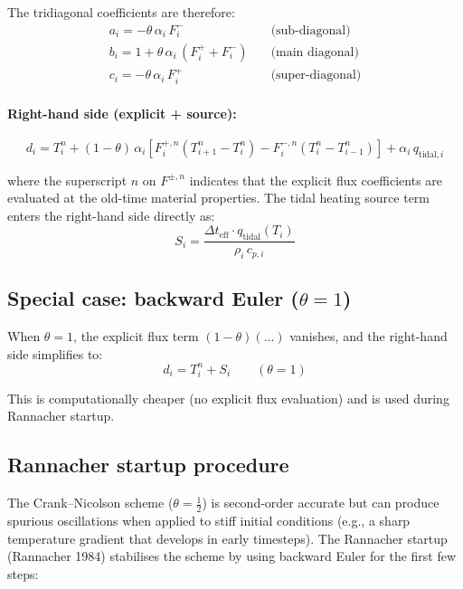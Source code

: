 \documentclass[11pt,a4paper]{article}
\newcommand{\half}{\tfrac{1}{2}}
\begin{document}
The tridiagonal coefficients are therefore:
\begin{align}
\boxed{a_i = -\theta\,\alpha_i\,F_i^{-}}
  &\quad\text{(sub-diagonal)} \label{eq:ai} \\
\boxed{b_i = 1 + \theta\,\alpha_i\,(F_i^{+} + F_i^{-})}
  &\quad\text{(main diagonal)} \label{eq:bi} \\
\boxed{c_i = -\theta\,\alpha_i\,F_i^{+}}
  &\quad\text{(super-diagonal)} \label{eq:ci}
\end{align}

\paragraph{Right-hand side (explicit + source):}
\begin{equation}
d_i = T_i^n
  + (1-\theta)\,\alpha_i\left[
    F_i^{+,n}(T_{i+1}^n - T_i^n) - F_i^{-,n}(T_i^n - T_{i-1}^n)
  \right]
  + \alpha_i\,q_{\mathrm{tidal},i}
\label{eq:rhs}
\end{equation}

where the superscript $n$ on $F^{\pm,n}$ indicates that the explicit
flux coefficients are evaluated at the old-time material properties.
The tidal heating source term enters the right-hand side directly as:
\begin{equation}
S_i = \frac{\Delta t_{\mathrm{eff}} \cdot q_{\mathrm{tidal}}(T_i)}
  {\rho_i\,c_{p,i}}
\label{eq:source}
\end{equation}

\subsection{Special case: backward Euler ($\theta = 1$)}

When $\theta = 1$, the explicit flux term $(1-\theta)(\ldots)$
vanishes, and the right-hand side simplifies to:
\begin{equation}
d_i = T_i^n + S_i \qquad (\theta = 1)
\end{equation}

This is computationally cheaper (no explicit flux evaluation) and is
used during Rannacher startup.

\subsection{Rannacher startup procedure}

The Crank--Nicolson scheme ($\theta = \half$) is second-order accurate
but can produce spurious oscillations when applied to stiff initial
conditions (e.g., a sharp temperature gradient that develops in early
timesteps). The Rannacher startup (Rannacher 1984) stabilises the
scheme by using backward Euler for the first few steps:
\end{document}
